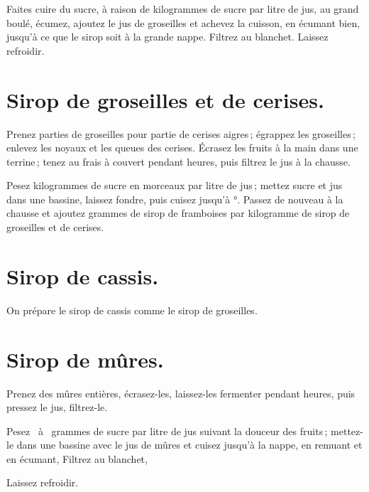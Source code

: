 Faites cuire du sucre, à raison de {\mmm} kilogrammes de sucre par litre
de jus, au grand boulé, écumez, ajoutez le jus de groseilles et achevez la
cuisson, en écumant bien, jusqu'à ce que le sirop soit à la grande nappe.
Filtrez au blanchet. Laissez refroidir.

\section*{\centering Sirop de groseilles et de cerises.}
{}

Prenez {\mmm} parties de groseilles pour {\mmm} partie de cerises
aigres ; égrappez les groseilles ; enlevez les noyaux et les queues des
cerises. Écrasez les fruits à la main dans une terrine ; tenez au frais
à couvert pendant {\mmm} heures, puis filtrez le jus à la chausse.

Pesez {\mmm} kilogrammes de sucre en morceaux par litre de jus ; mettez
sucre et jus dans une bassine, laissez fondre, puis cuisez jusqu'à
{\mmm}°. Passez de nouveau à la chausse et ajoutez {\mmm} grammes
de sirop de framboises par kilogramme de sirop de groseilles et de cerises.

\section*{\centering Sirop de cassis.}
{}

On prépare le sirop de cassis comme le sirop de groseilles.

\section*{\centering Sirop de mûres.}
{}

Prenez des mûres entières, écrasez-les, laissez-les fermenter pendant
{\mmm} heures, puis pressez le jus, filtrez-le.

Pesez {\mmm} {\mmm} à {\mmm} {\mmm} grammes de sucre
par litre de jus suivant la douceur des fruits ; mettez-le dans une bassine
avec le jus de mûres et cuisez jusqu'à la nappe, en remuant et en écumant,
Filtrez au blanchet,

Laissez refroidir.

